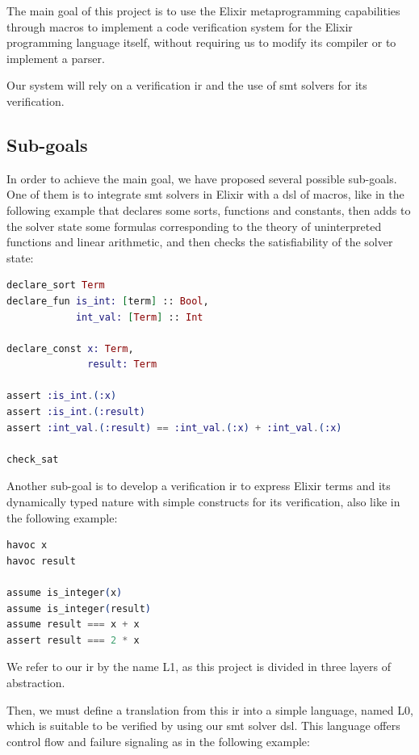 The main goal of this project is to use the Elixir metaprogramming capabilities
through macros to implement a code verification system for the Elixir
programming language itself, without requiring us to modify its compiler or to
implement a parser.

Our system will rely on a verification \gls{ir} and the use of \acrshort{smt}
solvers for its verification.

\subsection{Sub-goals}

In order to achieve the main goal, we have proposed several possible sub-goals.
One of them is to integrate \acrshort{smt} solvers in Elixir with a \gls{dsl} of
macros, like in the following example that declares some sorts, functions and
constants, then adds to the solver state some formulas corresponding to the
theory of uninterpreted functions and linear arithmetic, and then checks the 
satisfiability of the solver state:

\begin{lstlisting}[language=elixir,numbers=none,frame=none]
declare_sort Term
declare_fun is_int: [term] :: Bool,
            int_val: [Term] :: Int

declare_const x: Term, 
              result: Term

assert :is_int.(:x)
assert :is_int.(:result)
assert :int_val.(:result) == :int_val.(:x) + :int_val.(:x)

check_sat
\end{lstlisting}

Another sub-goal is to develop a verification \gls{ir} to express Elixir terms
and its dynamically typed nature with simple constructs for its verification,
also like in the following example:

\begin{lstlisting}[language=elixir,numbers=none,frame=none]
havoc x
havoc result

assume is_integer(x)
assume is_integer(result)
assume result === x + x
assert result === 2 * x 
\end{lstlisting}

We refer to our \gls{ir} by the name L1, as this project is divided in three
layers of abstraction.

Then, we must define a translation from this \gls{ir} into a simple language,
named L0, which is suitable to be verified by using our \acrshort{smt} solver
\gls{dsl}. This language offers control flow and failure signaling as in the
following example:


